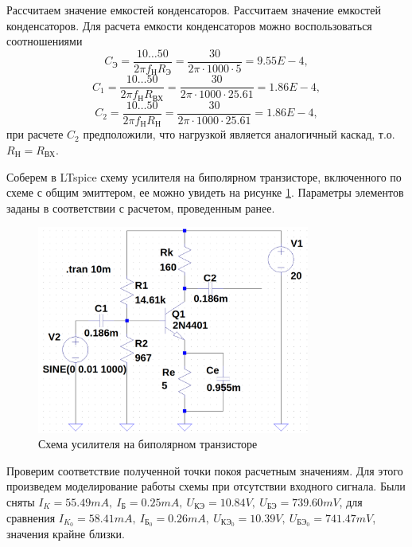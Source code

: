 Рассчитаем значение емкостей конденсаторов. Рассчитаем значение емкостей конденсаторов.
Для расчета емкости конденсаторов можно воспользоваться соотношениями
\begin{equation*}
    C_\text{Э}=\frac{10\dots50}{2\pi f_\text{Н}R_\text{Э}}=\frac{30}{2\pi\cdot1000\cdot 5}=9.55E-4,
\end{equation*}
\begin{equation*}
    C_1=\frac{10\dots50}{2\pi f_\text{Н}R_\text{ВХ}}=\frac{30}{2\pi\cdot1000\cdot 25.61}=1.86E-4,
\end{equation*}
\begin{equation*}
    C_2=\frac{10\dots50}{2\pi f_\text{Н}R_\text{Н}}=\frac{30}{2\pi\cdot1000\cdot 25.61}=1.86E-4,
\end{equation*}
при расчете $C_2$ предположили, что нагрузкой является аналогичный каскад, т.о. $R_\text{Н}=R_\text{ВХ}$.

Соберем в LTspice схему усилителя на биполярном транзисторе, включенного по схеме с общим эмиттером,
ее можно увидеть на рисунке \ref{fig:каскад}. Параметры элементов заданы в соответствии с расчетом, 
проведенным ранее.
\begin{figure}[H]
    \centering
    \includegraphics[width=0.8\textwidth]{figs/каскад.png}
    \caption{Схема усилителя на биполярном транзисторе}
    \label{fig:каскад}
\end{figure}
Проверим соответствие полученной точки покоя расчетным значениям. Для этого произведем 
моделирование работы схемы при отсутствии входного сигнала. Были сняты
$I_K=55.49mA,\ I_\text{Б}=0.25mA,\ U_\text{КЭ}=10.84V,\ U_\text{БЭ}=739.60mV$,
для сравнения $I_{K_0}=58.41mA,\ I_{\text{Б}_0}=0.26mA,\ U_{\text{КЭ}_0}=10.39V,\ U_{\text{БЭ}_0}=741.47mV$,
значения крайне близки.

